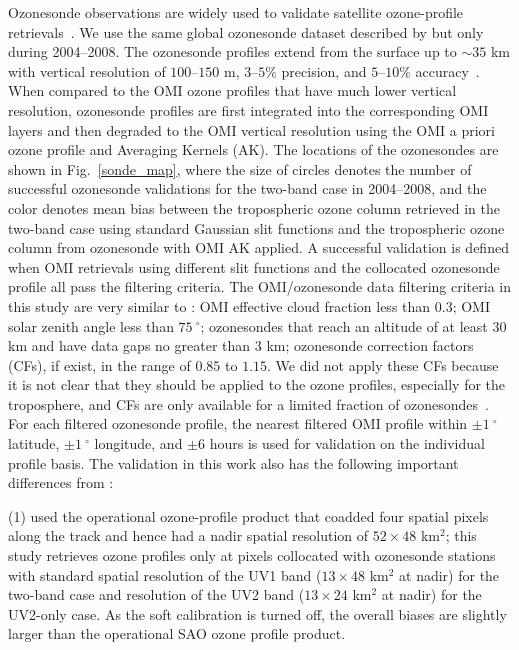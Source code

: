 \documentclass[amt,manuscript]{copernicus}
\begin{document}
Ozonesonde observations are widely used to validate satellite ozone-profile retrievals~\citep{RN2010,RN2055,RN9555,RN1953,RN1965,RN1989,huang2017}. We use the same global ozonesonde dataset described by \citet{huang2017} but only during 2004--2008. The ozonesonde profiles extend from the surface up to $\sim35$ km with vertical resolution of $100$--$150$ m, $3$--$5\%$ precision, and $5$--$10\%$ accuracy~\citep{komhyr1986operations,komhyr1995comparison,johnson2002ecc,smit2007assessment,deshler2008atmospheric}. When compared to the OMI ozone profiles that have much lower vertical resolution, ozonesonde profiles are first integrated into the corresponding OMI layers and then degraded to the OMI vertical resolution using the OMI a priori ozone profile and Averaging Kernels (AK). The locations of the ozonesondes are shown in Fig.~\ref{sonde_map}, where the size of circles denotes the number of successful ozonesonde validations for the two-band case in 2004--2008, and the color denotes mean bias between the tropospheric ozone column retrieved in the two-band case using standard Gaussian slit functions and the tropospheric ozone column from ozonesonde with OMI AK applied. A successful validation is defined when OMI retrievals using different slit functions and the collocated ozonesonde profile all pass the filtering criteria. The OMI/ozonesonde data filtering criteria in this study are very similar to \citet{huang2017}: OMI effective cloud fraction less than $0.3$; OMI solar zenith angle less than $75~^{\circ}$; ozonesondes that reach an altitude of at least $30$ km and have data gaps no greater than $3$ km; ozonesonde correction factors (CFs), if exist, in the range of $0.85$ to $1.15$. We did not apply these CFs because it is not clear that they should be applied to the ozone profiles, especially for the troposphere, and CFs are only available for a limited fraction of ozonesondes~\citep{morris2013use}. For each filtered ozonesonde profile, the nearest filtered OMI profile within $\pm1~^{\circ}$ latitude, $\pm1~^{\circ}$ longitude, and $\pm6$ hours is used for validation on the individual profile basis. The validation in this work also has the following important differences from \citet{huang2017}:

(1) \citet{huang2017} used the operational ozone-profile product that coadded four spatial pixels along the track and hence had a nadir spatial resolution of $52\times48$ km$^2$; this study retrieves ozone profiles only at pixels collocated with ozonesonde stations with standard spatial resolution of the UV1 band ($13\times48$ km$^2$ at nadir) for the two-band case and resolution of the UV2 band ($13\times24$ km$^2$ at nadir) for the UV2-only case. As the soft calibration is turned off, the overall biases are slightly larger than the operational SAO ozone profile product.
\end{document}
